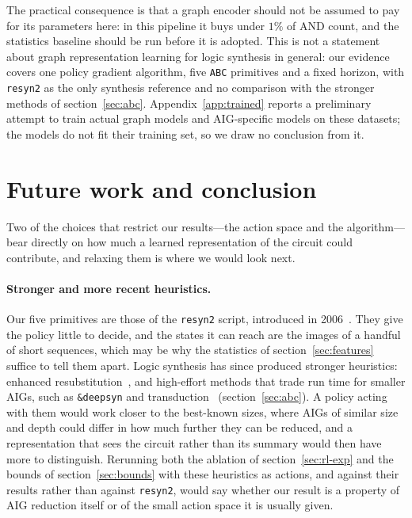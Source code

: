 \documentclass{article}
\begin{document}
The practical consequence is that a graph encoder should not be assumed to pay for its parameters here: in this pipeline it buys under $1\%$ of AND count, and the statistics baseline should be run before it is adopted.
This is not a statement about graph representation learning for logic synthesis in general: our evidence covers one policy gradient algorithm, five \texttt{ABC} primitives and a fixed horizon, with \texttt{resyn2} as the only synthesis reference and no comparison with the stronger methods of section~\ref{sec:abc}.
Appendix~\ref{app:trained} reports a preliminary attempt to train actual graph models and AIG-specific models on these datasets; the models do not fit their training set, so we draw no conclusion from it.

\section{Future work and conclusion}\label{sec:future}
Two of the choices that restrict our results---the action space and the algorithm---bear directly on how much a learned representation of the circuit could contribute, and relaxing them is where we would look next.

\paragraph{Stronger and more recent heuristics.}
Our five primitives are those of the \texttt{resyn2} script, introduced in 2006~\cite{rewriting}.
They give the policy little to decide, and the states it can reach are the images of a handful of short sequences, which may be why the statistics of section~\ref{sec:features} suffice to tell them apart.
Logic synthesis has since produced stronger heuristics: enhanced resubstitution~\cite{resub}, and high-effort methods that trade run time for smaller AIGs, such as \texttt{\&deepsyn} and transduction~\cite{transduction,randomized-transduction} (section~\ref{sec:abc}).
A policy acting with them would work closer to the best-known sizes, where AIGs of similar size and depth could differ in how much further they can be reduced, and a representation that sees the circuit rather than its summary would then have more to distinguish.
Rerunning both the ablation of section~\ref{sec:rl-exp} and the bounds of section~\ref{sec:bounds} with these heuristics as actions, and against their results rather than against \texttt{resyn2}, would say whether our result is a property of AIG reduction itself or of the small action space it is usually given.
\end{document}
